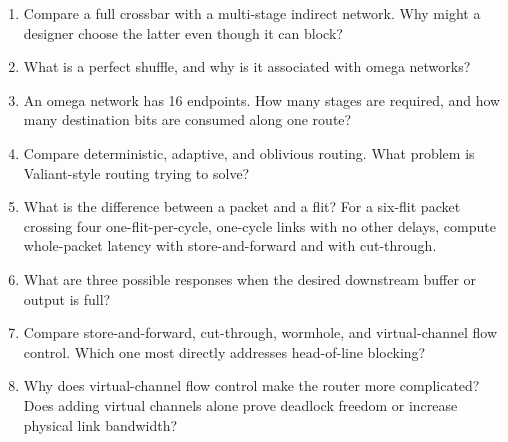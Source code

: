 \begin{enumerate}
    \item Compare a full crossbar with a multi-stage indirect network.
    Why might a designer choose the latter even though it can block?
    \item What is a perfect shuffle, and why is it associated with omega networks?
    \item An omega network has 16 endpoints.
    How many stages are required, and how many destination bits are consumed along one route?
    \item Compare deterministic, adaptive, and oblivious routing.
    What problem is Valiant-style routing trying to solve?
    \item What is the difference between a packet and a flit?
    For a six-flit packet crossing four one-flit-per-cycle, one-cycle links with no other delays, compute whole-packet latency with store-and-forward and with cut-through.
    \item What are three possible responses when the desired downstream buffer or output is full?
    \item Compare store-and-forward, cut-through, wormhole, and virtual-channel flow control.
    Which one most directly addresses head-of-line blocking?
    \item Why does virtual-channel flow control make the router more complicated?
    Does adding virtual channels alone prove deadlock freedom or increase physical link bandwidth?
\end{enumerate}
